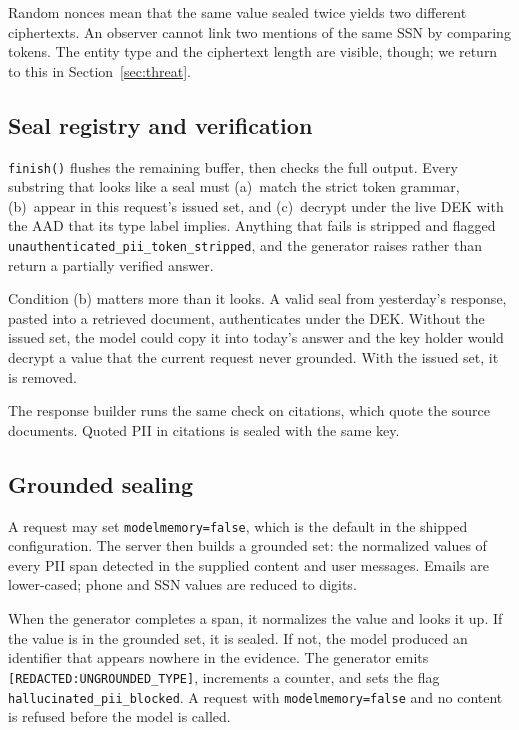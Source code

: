 \documentclass[11pt]{article}
\newcommand{\code}[1]{\texttt{#1}}
\begin{document}
Random nonces mean that the same value sealed twice yields two different ciphertexts. An observer cannot link two mentions of the same SSN by comparing tokens. The entity type and the ciphertext length are visible, though; we return to this in Section~\ref{sec:threat}.

\subsection{Seal registry and verification}
\label{sec:registry}

\code{finish()} flushes the remaining buffer, then checks the full output. Every substring that looks like a seal must (a)~match the strict token grammar, (b)~appear in this request's issued set, and (c)~decrypt under the live DEK with the AAD that its type label implies. Anything that fails is stripped and flagged \code{unauthenticated\_pii\_token\_stripped}, and the generator raises rather than return a partially verified answer.

Condition (b) matters more than it looks. A valid seal from yesterday's response, pasted into a retrieved document, authenticates under the DEK. Without the issued set, the model could copy it into today's answer and the key holder would decrypt a value that the current request never grounded. With the issued set, it is removed.

The response builder runs the same check on citations, which quote the source documents. Quoted PII in citations is sealed with the same key.

\subsection{Grounded sealing}
\label{sec:grounded}

A request may set \code{modelmemory=false}, which is the default in the shipped configuration. The server then builds a grounded set: the normalized values of every PII span detected in the supplied content and user messages. Emails are lower-cased; phone and SSN values are reduced to digits.

When the generator completes a span, it normalizes the value and looks it up. If the value is in the grounded set, it is sealed. If not, the model produced an identifier that appears nowhere in the evidence. The generator emits \code{[REDACTED:UNGROUNDED\_TYPE]}, increments a counter, and sets the flag \code{hallucinated\_pii\_blocked}. A request with \code{modelmemory=false} and no content is refused before the model is called.
\end{document}
